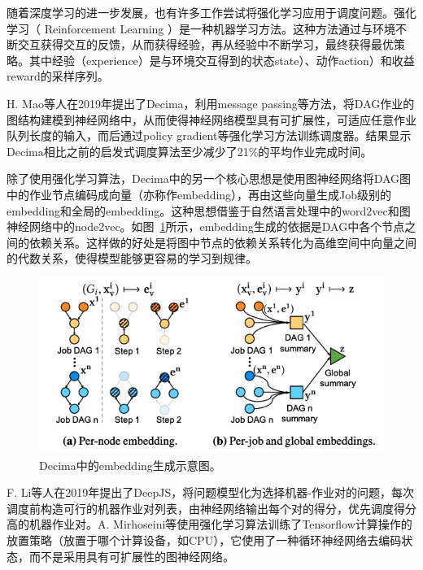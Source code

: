 随着深度学习的进一步发展，也有许多工作尝试将强化学习应用于调度问题。强化学习（ Reinforcement Learning ）是一种机器学习方法。这种方法通过与环境不断交互获得交互的反馈，从而获得经验，再从经验中不断学习，最终获得最优策略。其中经验（experience）是与环境交互得到的状态state）、动作action）和收益reward的采样序列。

H. Mao等人在2019年提出了Decima\parencite{mao2019learning}，利用message passing等方法，将DAG作业的图结构建模到神经网络中，从而使得神经网络模型具有可扩展性，可适应任意作业队列长度的输入，而后通过policy gradient等强化学习方法训练调度器。结果显示Decima相比之前的启发式调度算法至少减少了21\%的平均作业完成时间。

除了使用强化学习算法，Decima中的另一个核心思想是使用图神经网络将DAG图中的作业节点编码成向量（亦称作embedding），再由这些向量生成Job级别的embedding和全局的embedding。这种思想借鉴于自然语言处理中的word2vec和图神经网络中的node2vec。如图~\ref{decima_embedding}所示，embedding生成的依据是DAG中各个节点之间的依赖关系。这样做的好处是将图中节点的依赖关系转化为高维空间中向量之间的代数关系，使得模型能够更容易的学习到规律。

\begin{figure}[h]
    \centerline{\includegraphics[width=\textwidth]{figures/decima-embedding.png}}
    \caption{Decima中的embedding生成示意图。}
    \label{decima_embedding}
\end{figure}

F. Li等人在2019年提出了DeepJS\parencite{li2019deepjs}，将问题模型化为选择机器-作业对的问题，每次调度前构造可行的机器作业对列表，由神经网络输出每个对的得分，优先调度得分高的机器作业对。A. Mirhoseini等\parencite{mirhoseini2017device}使用强化学习算法训练了Tensorflow计算操作的放置策略（放置于哪个计算设备，如CPU），它使用了一种循环神经网络去编码状态，而不是采用具有可扩展性的图神经网络。

